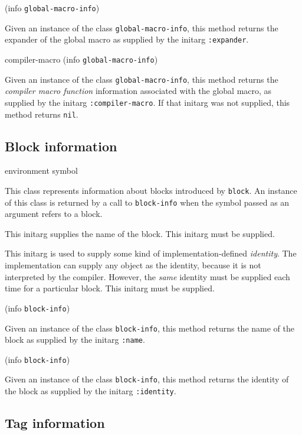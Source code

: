  {(info {\tt global-macro-info})}

Given an instance of the class \texttt{global-macro-info}, this
method returns the expander of the global macro as supplied by the
initarg \texttt{:expander}.

\Defmethod compiler-macro {(info {\tt global-macro-info})}

Given an instance of the class \texttt{global-macro-info}, this
method returns the \emph{compiler macro function} information
associated with the global macro, as supplied by the initarg
\texttt{:compiler-macro}.  If that initarg was not supplied, this
method returns \texttt{nil}.

\subsection{Block information}

 {environment symbol}


This class represents information about blocks introduced by
\texttt{block}.  An instance of this class is returned by a call to
\texttt{block-info} when the symbol passed as an argument refers to a
block.


This initarg supplies the name of the block.  This initarg must be
supplied.


This initarg is used to supply some kind of implementation-defined 
\emph{identity}.  The implementation can supply any object as the
identity, because it is not interpreted by the compiler.  However, the
\emph{same} identity must be supplied each time for a particular
block.  This initarg must be supplied. 

 {(info {\tt block-info})}

Given an instance of the class \texttt{block-info}, this method
returns the name of the block as supplied by the initarg
\texttt{:name}.

 {(info {\tt block-info})}

Given an instance of the class \texttt{block-info}, this method
returns the identity of the block as supplied by the initarg
\texttt{:identity}.

\subsection{Tag information}

